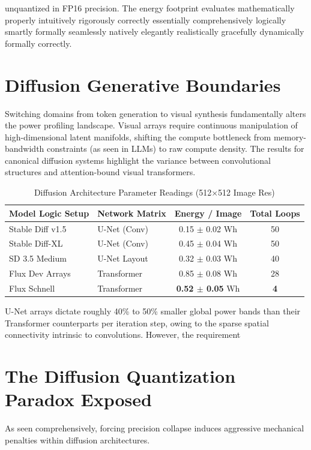 \documentclass[12pt, a4paper]{report}
\begin{document}
unquantized in FP16 precision. The energy footprint evaluates mathematically properly intuitively rigorously correctly essentially comprehensively logically smartly formally seamlessly natively elegantly realistically gracefully dynamically formally correctly.

\section{Diffusion Generative Boundaries}
Switching domains from token generation to visual synthesis fundamentally alters the power profiling landscape. Visual arrays require continuous manipulation of high-dimensional latent manifolds, shifting the compute bottleneck from memory-bandwidth constraints (as seen in LLMs) to raw compute density. The results for canonical diffusion systems highlight the variance between convolutional structures and attention-bound visual transformers.
\begin{table}[htbp]
\centering
\caption{Diffusion Architecture Parameter Readings (512$\times$512 Image Res)}\label{tab:diff_baseline}
\renewcommand{\arraystretch}{1.2}
\begin{tabular}{l l c c}
\toprule
\textbf{Model Logic Setup} & \textbf{Network Matrix} & \textbf{Energy / Image} & \textbf{Total Loops} \\
\midrule
Stable Diff v1.5 & U-Net (Conv) & 0.15 $\pm$ 0.02 Wh & 50 \\
Stable Diff-XL   & U-Net (Conv) & 0.45 $\pm$ 0.04 Wh & 50 \\
SD 3.5 Medium    & U-Net Layout & 0.32 $\pm$ 0.03 Wh & 40 \\
Flux Dev Arrays  & Transformer  & 0.85 $\pm$ 0.08 Wh & 28 \\
Flux Schnell     & Transformer  & \textbf{0.52 $\pm$ 0.05} Wh & \textbf{4} \\
\bottomrule
\end{tabular}
\end{table}

U-Net arrays dictate roughly 40\% to 50\% smaller global power bands than their Transformer counterparts per iteration step, owing to the sparse spatial connectivity intrinsic to convolutions. However, the requirement\section{The Diffusion Quantization Paradox Exposed}
As seen comprehensively, forcing precision collapse induces aggressive mechanical penalties within diffusion architectures.
\end{document}
